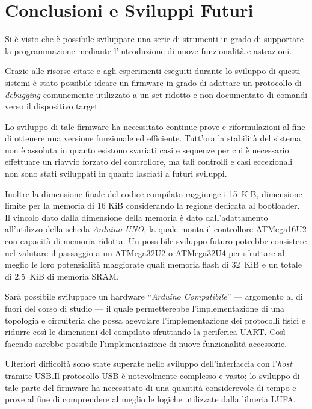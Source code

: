 \chapter*{Conclusioni e Sviluppi Futuri}

Si è visto che è possibile sviluppare una serie di strumenti in grado di supportare la programmazione mediante l'introduzione di nuove funzionalità e astrazioni.

Grazie alle risorse citate e agli esperimenti eseguiti durante lo sviluppo di questi sistemi è stato possibile ideare un firmware in grado di adattare un protocollo di \textit{debugging} comunemente utilizzato a un set ridotto e non documentato di comandi verso il dispositivo target.

Lo sviluppo di tale firmware ha necessitato continue prove e riformulazioni al fine di ottenere una versione funzionale ed efficiente. Tutt'ora la stabilità del sistema non è assoluta in quanto esistono svariati casi e sequenze per cui è necessario effettuare un riavvio forzato del controllore, ma tali controlli e casi eccezionali non sono stati sviluppati in quanto lasciati a futuri sviluppi.

Inoltre la dimensione finale del codice compilato raggiunge i \SI{15}{KiB}, dimensione limite per la memoria di 16 KiB considerando la regione dedicata al bootloader. Il vincolo dato dalla dimensione della memoria è dato dall'adattamento all'utilizzo della scheda \textit{Arduino UNO}, la quale monta il controllore ATMega16U2 con capacità di memoria ridotta. Un possibile sviluppo futuro potrebbe consistere nel valutare il passaggio a un ATMega32U2 o ATMega32U4 per sfruttare al meglio le loro potenzialità maggiorate quali memoria flash di \SI{32}{KiB} e un totale di \SI{2.5}{KiB} di memoria SRAM\cite{avr:m16u4}.

Sarà possibile sviluppare un hardware ``\textit{Arduino Compatibile}'' --- argomento al di fuori del corso di studio --- il quale permetterebbe l'implementazione di una topologia e circuiteria che possa agevolare l'implementazione dei protocolli fisici e ridurre così le dimensioni del compilato sfruttando la periferica UART.\@
Così facendo sarebbe possibile l'implementazione di nuove funzionalità accessorie.

Ulteriori difficoltà sono state superate nello sviluppo dell'interfaccia con l'\textit{host} tramite USB.\@ Il protocollo USB è notevolmente complesso e vasto; lo sviluppo di tale parte del firmware ha necessitato di una quantità considerevole di tempo e prove al fine di comprendere al meglio le logiche utilizzate dalla libreria LUFA.\@

